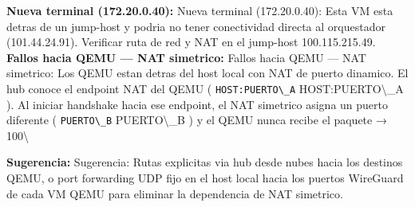 \documentclass[11pt,a4paper]{article}
\begin{document}
\textbf{Nueva terminal (172.20.0.40):} Nueva terminal (172.20.0.40):  Esta VM esta detras de un jump-host y podria no tener conectividad directa al orquestador (101.44.24.91). Verificar ruta de red y NAT en el jump-host 100.115.215.49.\\

\textbf{Fallos hacia QEMU — NAT simetrico:} Fallos hacia QEMU — NAT simetrico:  Los QEMU estan detras del host local con NAT de puerto dinamico. El hub conoce el endpoint NAT del QEMU ( \texttt{HOST:PUERTO\textbackslash{}_A} HOST:PUERTO\textbackslash{}_A ). Al iniciar handshake hacia ese endpoint, el NAT simetrico asigna un puerto diferente ( \texttt{PUERTO\textbackslash{}_B} PUERTO\textbackslash{}_B ) y el QEMU nunca recibe el paquete → 100\textbackslash{}%

\textbf{Sugerencia:} Sugerencia:  Rutas explicitas via hub desde nubes hacia los destinos QEMU, o port forwarding UDP fijo en el host local hacia los puertos WireGuard de cada VM QEMU para eliminar la dependencia de NAT simetrico.\\
\end{document}
